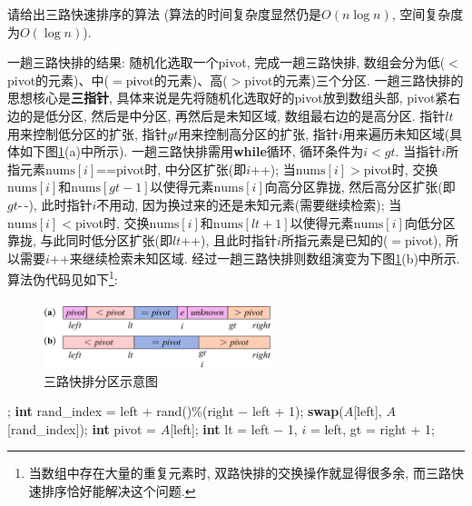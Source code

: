 \documentclass{article}
\begin{document}
\begin{homeworkProblem}
	请给出三路快速排序的算法 (算法的时间复杂度显然仍是$O(n\log n)$, 空间复杂度为$O(\log n)$).

	\solution 一趟三路快排的结果: 随机化选取一个pivot, 完成一趟三路快排, 数组会分为低($<$pivot的元素)、中($=$pivot的元素)、高($>$pivot的元素)三个分区. 一趟三路快排的思想核心是\textbf{三指针}, 具体来说是先将随机化选取好的pivot放到数组头部, pivot紧右边的是低分区, 然后是中分区, 再然后是未知区域, 数组最右边的是高分区. 指针$lt$用来控制低分区的扩张, 指针$gt$用来控制高分区的扩张, 指针$i$用来遍历未知区域(具体如下图\ref{fig:三路快排分区示意图}(a)中所示). 一趟三路快排需用\textbf{while}循环, 循环条件为$i<gt$. 当指针$i$所指元素$\text{nums}[i]$==pivot时, 中分区扩张(即$i$++); 当$\text{nums}[i]>$pivot时, 交换$\text{nums}[i]$和$\text{nums}[gt-1]$以使得元素$\text{nums}[i]$向高分区靠拢, 然后高分区扩张(即$gt$-\,-), 此时指针$i$不用动, 因为换过来的还是未知元素(需要继续检索); 当$\text{nums}[i]<$pivot时, 交换$\text{nums}[i]$和$\text{nums}[lt+1]$以使得元素$\text{nums}[i]$向低分区靠拢, 与此同时低分区扩张(即$lt$++), 且此时指针$i$所指元素是已知的($=$pivot), 所以需要$i$++来继续检索未知区域. 经过一趟三路快排则数组演变为下图\ref{fig:三路快排分区示意图}(b)中所示. 算法伪代码见如下\footnote{当数组中存在大量的重复元素时, 双路快排的交换操作就显得很多余, 而三路快速排序恰好能解决这个问题.}:
	\begin{figure}[H]  %
		\centering
		\includegraphics[width=0.6\textwidth]{images/title/三路快速排序.pdf}
		\caption{三路快排分区示意图}
		\label{fig:三路快排分区示意图}
	\end{figure}
	\begin{algorithm}[H]
		\begin{algorithmic}[1]
		 
			\State \Return;
		\EndIf
		\State \textbf{int} rand_index = left + rand()$\%$(right $-$ left + 1); 
		\State \textbf{swap}($A$[left], $A$[rand_index]); 
		\State \textbf{int} pivot = $A$[left];
		\State \textbf{int} lt = left $-$ 1, $i$ = left, gt = right + 1; 
		 

\end{algorithmic}
\end{algorithm}
\end{homeworkProblem}
\end{document}
